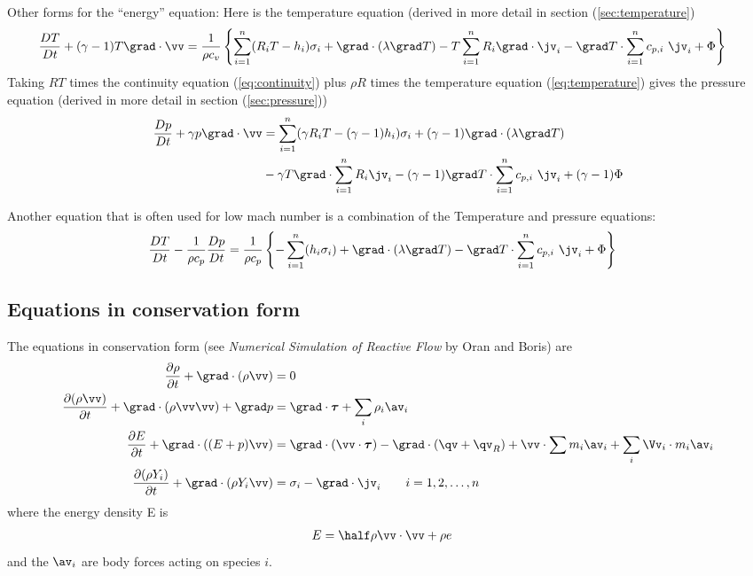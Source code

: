 \documentclass{article}
\begin{document}
Other forms for the ``energy'' equation: Here is the temperature equation
(derived in more detail in section (\ref{sec:temperature})
\begin{align}
  {D T\over Dt} + (\gamma-1) T \grad\cdot\vv & = 
       {1\over \rho c_v}  \left\{ \sumi  (R_i T-h_i) \sigma_i + \grad\cdot(\lambda\grad T)
      - T \sumi  R_i \grad\cdot\jv_i - \grad T \cdot\sumi c_{p,i} ~ \jv_i
              + \Phi \right\} 
           \label{eq:temperature} 
\end{align}
Taking $RT$ times the continuity equation (\ref{eq:continuity}) plus $\rho R$ 
times the temperature equation (\ref{eq:temperature}) gives the pressure equation
(derived in more detail in section (\ref{sec:pressure}))
\begin{align}
    {D p\over Dt} + \gamma p \grad\cdot\vv &= 
        \sumi  (\gamma R_i T-(\gamma-1)h_i) \sigma_i + (\gamma-1) \grad\cdot(\lambda\grad T) \\
    &  - \gamma T \grad\cdot \sumi R_i\jv_i - (\gamma-1) \grad T \cdot \sumi c_{p,i} ~\jv_i
              + (\gamma-1) \Phi \label{eq:pressure}
\end{align}

Another equation that is often used for low mach number is a combination of the Temperature
and pressure equations:
\begin{align}
  {D T\over Dt} - {1\over \rho c_p} {D p\over Dt} & = 
       {1\over \rho c_p}  \left\{ -\sumi (h_i\sigma_i) + \grad\cdot(\lambda\grad T)
      - \grad T \cdot\sumi c_{p,i} ~ \jv_i
              + \Phi \right\} \label{eq:TP}
\end{align}

\subsection{Equations in conservation form}

The equations in conservation form (see {\sl Numerical Simulation of Reactive Flow} by Oran and Boris)
are
\begin{align*}
   {\partial \rho  \over \partial t} + \grad\cdot(\rho \vv)&=0 \\
   {\partial (\rho\vv)  \over \partial t}  + \grad\cdot(\rho\vv\vv) + \grad p &= \grad\cdot\tauv
              +  \sum_i \rho_i \av_i \\
   {\partial E  \over \partial t}  + \grad\cdot( (E+p)\vv ) &= \grad\cdot( \vv\cdot\tauv )
            - \grad\cdot(\qv+\qv_R) + \vv\cdot\sum m_i\av_i + \sum_i \Vv_i\cdot m_i \av_i    \\
  {\partial (\rho Y_i) \over \partial t} + \grad\cdot(\rho Y_i\vv) &= \sigma_i 
               -\grad\cdot\jv_i \qquad i=1,2,\ldots,n
\end{align*}
where the energy density E is
\begin{align*}
 E &= \half \rho \vv\cdot\vv + \rho e
\end{align*}
and the $\av_i$ are body forces acting on species $i$.
\end{document}
